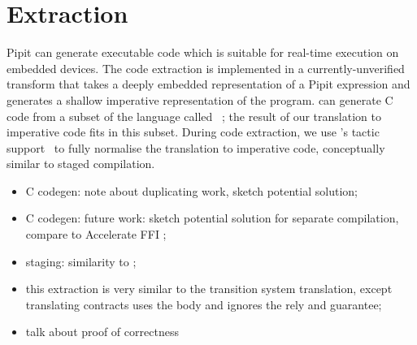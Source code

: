 

\section{Extraction}
\label{s:extraction}

Pipit can generate executable code which is suitable for real-time execution on embedded devices.
The code extraction is implemented in a currently-unverified transform that takes a deeply embedded representation of a Pipit expression and generates a shallow imperative representation of the program.
\fstar{} can generate C code from a subset of the language called \lowstar{}~\cite{protzenko2017verified}; the result of our translation to imperative code fits in this subset.
During code extraction, we use \fstar{}'s tactic support~\cite{martinez2019meta} to fully normalise the translation to imperative code, conceptually similar to staged compilation.






\TODO{}
\begin{itemize}
  \item C codegen: note about duplicating work, sketch potential solution;
  \item C codegen: future work: sketch potential solution for separate compilation, compare to Accelerate FFI \cite{clifton2014embedding};
  \item staging: similarity to \cite{gallego2021w};
  \item this extraction is very similar to the transition system translation, except translating contracts uses the body and ignores the rely and guarantee;
  \item talk about proof of correctness
\end{itemize}
